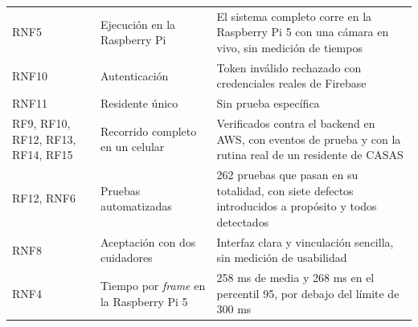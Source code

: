 \begin{table}[H]
\begin{tabular}{@{}p{2.5cm}p{4.6cm}p{7.3cm}@{}}
RNF5 & Ejecución en la Raspberry Pi & El sistema completo corre en la Raspberry Pi 5 con una cámara en vivo, sin medición de tiempos \\
RNF10 & Autenticación & Token inválido rechazado con credenciales reales de Firebase \\
RNF11 & Residente único & Sin prueba específica \\
RF9, RF10, RF12, RF13, RF14, RF15 & Recorrido completo en un celular & Verificados contra el backend en AWS, con eventos de prueba y con la rutina real de un residente de CASAS \\
RF12, RNF6 & Pruebas automatizadas & 262 pruebas que pasan en su totalidad, con siete defectos introducidos a propósito y todos detectados \\
RNF8 & Aceptación con dos cuidadores & Interfaz clara y vinculación sencilla, sin medición de usabilidad \\
RNF4 & Tiempo por \textit{frame} en la Raspberry Pi 5 & 258 ms de media y 268 ms en el percentil 95, por debajo del límite de 300 ms \\
\bottomrule
\end{tabular}
\end{table}
